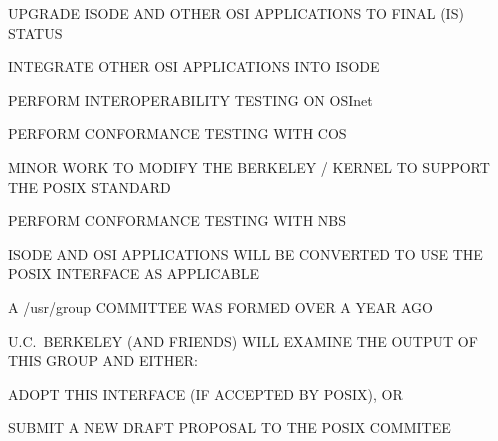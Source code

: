 \begin{bwslide}

\begin{nrtc}
\item	UPGRADE ISODE AND OTHER OSI APPLICATIONS TO FINAL (IS) STATUS

\item	INTEGRATE OTHER OSI APPLICATIONS INTO ISODE

\item	PERFORM INTEROPERABILITY TESTING ON OSInet

\item	PERFORM CONFORMANCE TESTING WITH COS
\end{nrtc}
\end{bwslide}


\begin{bwslide}

\begin{nrtc}
\item	MINOR WORK TO MODIFY THE BERKELEY \unix/ KERNEL TO SUPPORT THE POSIX
	STANDARD

\item	PERFORM CONFORMANCE TESTING WITH NBS

\item	ISODE AND OSI APPLICATIONS WILL BE CONVERTED TO USE THE POSIX
	INTERFACE AS APPLICABLE
\end{nrtc}
\end{bwslide}


\begin{bwslide}

\begin{nrtc}
\item	A /usr/group COMMITTEE WAS FORMED OVER A YEAR AGO

\item	U.C.~BERKELEY (AND FRIENDS) WILL EXAMINE THE OUTPUT OF THIS
	GROUP AND EITHER:
    \begin{nrtc}
    \item	ADOPT THIS INTERFACE (IF ACCEPTED BY POSIX), OR

    \item	SUBMIT A NEW DRAFT PROPOSAL TO THE POSIX COMMITEE
    \end{nrtc}
\end{nrtc}
\end{bwslide}



